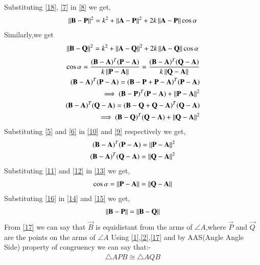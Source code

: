 \documentclass[journal,12pt,twocolumn]{IEEEtran}
\begin{document}
Substituting \eqref{18}, \eqref{7} in \eqref{8} we get,
\begin{align}
  \begin{split}
      \left\lVert\mathbf{B}-\mathbf{P}\right\rVert^2=k^2+\left\lVert\mathbf{A}-\mathbf{P}\right\rVert^2
      +2k\left\lVert\mathbf{A}-\mathbf{P}\right\rVert\cos\alpha\label{14}
  \end{split}  
\end{align}
Similarly,we get
\begin{align}
    \left\lVert\mathbf{B}-\mathbf{Q}\right\rVert^2=k^2+\left\lVert\mathbf{A}-\mathbf{Q}\right\rVert^2
      +2k\left\lVert\mathbf{A}-\mathbf{Q}\right\rVert\cos\alpha\label{15}
\end{align}
\begin{align}
    \cos\alpha = \frac{(\mathbf{B}-\mathbf{A})^T(\mathbf{P}-\mathbf{A})}{k\left\lVert\mathbf{P}-\mathbf{A}\right\rVert} = \frac{(\mathbf{B}-\mathbf{A})^T(\mathbf{Q}-\mathbf{A})}{k\left\lVert\mathbf{Q}-\mathbf{A}\right\rVert}\label{13}\\
    (\mathbf{B}-\mathbf{A})^T(\mathbf{P}-\mathbf{A})=(\mathbf{B}-\mathbf{P}+\mathbf{P}-\mathbf{A})^T(\mathbf{P}-\mathbf{A})\\
    \implies (\mathbf{B}-\mathbf{P})^T(\mathbf{P}-\mathbf{A}) + \left\lVert\mathbf{P}-\mathbf{A}\right\rVert^2\label{9}\\
    (\mathbf{B}-\mathbf{A})^T(\mathbf{Q}-\mathbf{A})=(\mathbf{B}-\mathbf{Q}+\mathbf{Q}-\mathbf{A})^T(\mathbf{Q}-\mathbf{A})\\
     \implies (\mathbf{B}-\mathbf{Q})^T(\mathbf{Q}-\mathbf{A}) + \left\lVert\mathbf{Q}-\mathbf{A}\right\rVert^2\label{10}
\end{align}
Substituting \eqref{5} and \eqref{6} in \eqref{10} and \eqref{9} respectively we get,
\begin{align}
    (\mathbf{B}-\mathbf{A})^T(\mathbf{P}-\mathbf{A})=\left\lVert\mathbf{P}-\mathbf{A}\right\rVert^2\label{11}\\
    (\mathbf{B}-\mathbf{A})^T(\mathbf{Q}-\mathbf{A})=\left\lVert\mathbf{Q}-\mathbf{A}\right\rVert^2\label{12}
\end{align}
Substituting \eqref{11} and \eqref{12} in \eqref{13} we get,
\begin{align}
    \cos\alpha=\left\lVert\mathbf{P}-\mathbf{A}\right\rVert=\left\lVert\mathbf{Q}-\mathbf{A}\right\rVert\label{16}
\end{align}
Substituting \eqref{16} in \eqref{14} and \eqref{15} we get,
\begin{align}
    \left\lVert\mathbf{B}-\mathbf{P}\right\rVert=\left\lVert\mathbf{B}-\mathbf{Q}\right\rVert\label{17}
\end{align}
From \eqref{17} we can say that $\vec{B}$ is equidistant from the arms of $\angle{A}$,where $\vec{P}$ and $\vec{Q}$ are the points on the arms of $\angle{A}$
Using \eqref{1},\eqref{2},\eqref{17} and by AAS(Angle Angle Side) property of congruency we can say that:-\\
\begin{align}
\triangle APB \cong \triangle AQB
\end{align}
\end{document}
